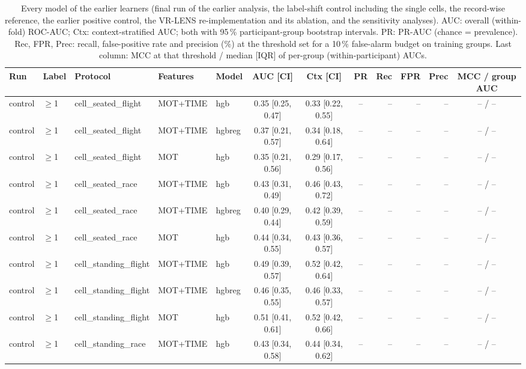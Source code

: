 \begin{longtable}{@{}lllllcccrrrc@{}}
\caption{Every model of the earlier learners (final run of the earlier analysis, the label-shift control including the single cells, the record-wise reference, the earlier positive control, the VR-LENS re-implementation and its ablation, and the sensitivity analyses). AUC: overall (within-fold) ROC-AUC; Ctx: context-stratified AUC; both with 95\,\% participant-group bootstrap intervals. PR: PR-AUC (chance = prevalence). Rec, FPR, Prec: recall, false-positive rate and precision (\%) at the threshold set for a 10\,\% false-alarm budget on training groups. Last column: MCC at that threshold / median [IQR] of per-group (within-participant) AUCs.}\\
\toprule
Run & Label & Protocol & Features & Model & AUC [CI] & Ctx [CI] & PR & Rec & FPR & Prec & MCC / group AUC \\
\midrule
\endhead
control & $\geq$1 & cell\_seated\_flight & MOT+TIME & hgb & 0.35 [0.25, 0.47] & 0.33 [0.22, 0.55] & -- & -- & -- & -- & -- / -- \\
control & $\geq$1 & cell\_seated\_flight & MOT+TIME & hgbreg & 0.37 [0.21, 0.57] & 0.34 [0.18, 0.64] & -- & -- & -- & -- & -- / -- \\
control & $\geq$1 & cell\_seated\_flight & MOT & hgb & 0.35 [0.21, 0.56] & 0.29 [0.17, 0.56] & -- & -- & -- & -- & -- / -- \\
control & $\geq$1 & cell\_seated\_race & MOT+TIME & hgb & 0.43 [0.31, 0.49] & 0.46 [0.43, 0.72] & -- & -- & -- & -- & -- / -- \\
control & $\geq$1 & cell\_seated\_race & MOT+TIME & hgbreg & 0.40 [0.29, 0.44] & 0.42 [0.39, 0.59] & -- & -- & -- & -- & -- / -- \\
control & $\geq$1 & cell\_seated\_race & MOT & hgb & 0.44 [0.34, 0.55] & 0.43 [0.36, 0.57] & -- & -- & -- & -- & -- / -- \\
control & $\geq$1 & cell\_standing\_flight & MOT+TIME & hgb & 0.49 [0.39, 0.57] & 0.52 [0.42, 0.64] & -- & -- & -- & -- & -- / -- \\
control & $\geq$1 & cell\_standing\_flight & MOT+TIME & hgbreg & 0.46 [0.35, 0.55] & 0.46 [0.33, 0.57] & -- & -- & -- & -- & -- / -- \\
control & $\geq$1 & cell\_standing\_flight & MOT & hgb & 0.51 [0.41, 0.61] & 0.52 [0.42, 0.66] & -- & -- & -- & -- & -- / -- \\
control & $\geq$1 & cell\_standing\_race & MOT+TIME & hgb & 0.43 [0.34, 0.58] & 0.44 [0.34, 0.62] & -- & -- & -- & -- & -- / -- \\

\end{longtable}
